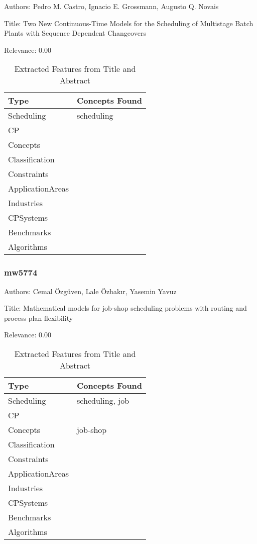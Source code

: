 Authors: Pedro M. Castro, Ignacio E. Grossmann, Augusto Q. Novais

Title: Two New Continuous-Time Models for the Scheduling of Multistage Batch Plants with Sequence Dependent Changeovers

Relevance:  0.00

{\scriptsize
\begin{longtable}{p{2cm}p{20cm}}
\caption{Extracted Features from Title and Abstract}\\ \toprule
Type & Concepts Found\\ \midrule
\endhead
\bottomrule
\endfoot
Scheduling & scheduling\\ 
CP & \\ 
Concepts & \\ 
Classification & \\ 
Constraints & \\ 
ApplicationAreas & \\ 
Industries & \\ 
CPSystems & \\ 
Benchmarks & \\ 
Algorithms & \\ 
\end{longtable}
}



\subsubsection{mw5774}
\label{mw:mw5774}

Authors: Cemal Özgüven, Lale Özbakır, Yasemin Yavuz

Title: Mathematical models for job-shop scheduling problems with routing and process plan flexibility

Relevance:  0.00

{\scriptsize
\begin{longtable}{p{2cm}p{20cm}}
\caption{Extracted Features from Title and Abstract}\\ \toprule
Type & Concepts Found\\ \midrule
\endhead
\bottomrule
\endfoot
Scheduling & scheduling, job\\ 
CP & \\ 
Concepts & job-shop\\ 
Classification & \\ 
Constraints & \\ 
ApplicationAreas & \\ 
Industries & \\ 
CPSystems & \\ 
Benchmarks & \\ 
Algorithms & \\ 
\end{longtable}
}



